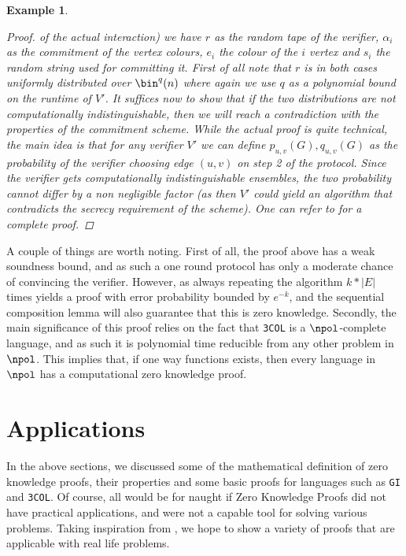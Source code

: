 \documentclass{article}
\newtheorem{example}{Example}
\begin{document}
\begin{example}
\begin{proof}
        of the actual interaction)
        we have $r$ as the random tape of the verifier, $\alpha_i$ as the commitment of the vertex colours, $e_i$ the colour of the $i$ vertex and $s_i$ the
        random string used for committing it. First of all note that $r$ is in both cases uniformly distributed over $\bin^q(n)$ where again we
        use $q$ as a polynomial bound on the runtime of $V'$. It suffices now to show that if the two distributions are
        not computationally indistinguishable, then we will reach a contradiction with the properties of the commitment scheme.
        While the actual proof is quite technical, the main idea is that for any verifier $V'$ we can
        define $p_{u, v}(G), q_{u,v}(G)$ as the probability of the verifier choosing edge $(u,v)$ on step 2 of the protocol.
        Since the verifier gets computationally indistinguishable ensembles, the two probability cannot differ by a non negligible factor
        (as then $V'$ could yield an algorithm that contradicts the secrecy requirement of the scheme). One can refer to \cite{goldreichFoundationsCryptographyVol2007}
        for a complete proof.

    \end{proof}
\end{example}

A couple of things are worth noting. First of all, the proof above has a weak soundness bound, and as such
a one round protocol has only a moderate chance of convincing the verifier. However, as always repeating the
algorithm $k * |E|$ times yields a proof with error probability bounded by $e^{-k}$, and the sequential composition lemma will
also guarantee that this is zero knowledge. Secondly, the main significance of this proof relies on the fact that
\texttt{3COL} is a $\npol$-complete language, and as such it is polynomial time reducible from any other problem in $\npol$.
This implies that, if one way functions exists, then every language in $\npol$ has a computational zero knowledge proof.

\section{Applications}
\label{applications}
In the above sections, we discussed some of the mathematical definition of zero knowledge proofs, their properties and some basic
proofs for languages such as \texttt{GI} and \texttt{3COL}. Of course, all would be for naught if Zero Knowledge Proofs
did not have practical applications, and were not a capable tool for solving various problems.
Taking inspiration from \cite{moraisSurveyZeroKnowledge2019}, we hope to show a variety of proofs that
are applicable with real life problems.
\end{document}
